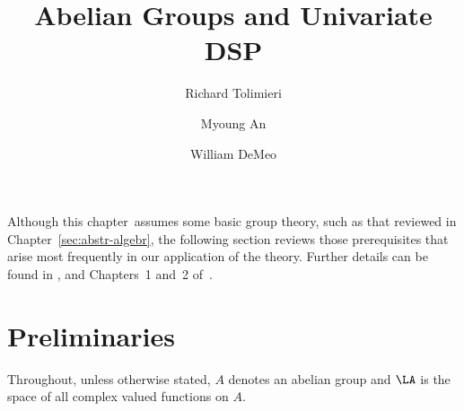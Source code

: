 


\title{Abelian Groups and Univariate DSP}
\author{Richard Tolimieri \and Myoung An\and William DeMeo}
\maketitle

\newcommand\sectype{chapter}
\newcommand\chznz{\ensuremath{(\mathbb{Z} / N )^*}}


Although this \sectype\ assumes some basic group theory,
such as that reviewed in Chapter~\ref{sec:abstr-algebr}, the
following section reviews those prerequisites that arise
most frequently in our application of the theory. Further
details can be found in \cite{Fraleigh:1994}, and Chapters~1
and~2 of~\cite{Tolimieri:1998}. 

\section{Preliminaries}

Throughout, unless otherwise stated, $A$ denotes an abelian group and
$\LA$ is the space of all complex valued functions on $A$.

